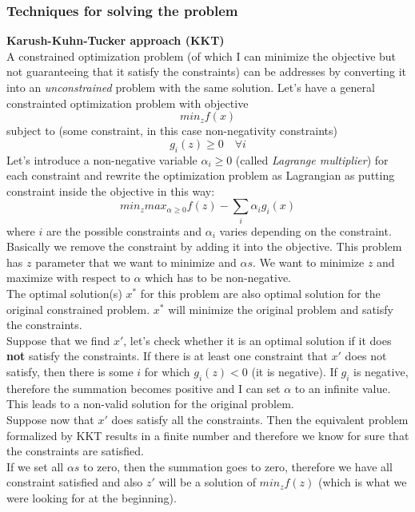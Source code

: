         \subsubsection{Techniques for solving the problem}
            \textbf{Karush-Kuhn-Tucker approach (KKT)}\\
            A constrained optimization problem (of which I can minimize the objective but not guaranteeing that it satisfy the constraints) can be addresses by converting it into an \textit{unconstrained} problem with the same solution. 
            Let's have a general constrainted optimization problem with objective
            $$min_z f(x)$$
            subject to (some constraint, in this case non-negativity constraints)
            $$g_i(z) \geq 0 \quad \forall i$$
            Let's introduce a non-negative variable $\alpha_i \geq 0$ (called \textit{Lagrange multiplier}) for each constraint and rewrite the optimization problem as Lagrangian as putting constraint inside the objective in this way:
            $$min_z max_{\alpha \geq 0} f(z) - \sum_{i} \alpha_i g_i(x)$$
            where $i$ are the possible constraints and $\alpha_i$ varies depending on the constraint. 
            Basically we remove the constraint by adding it into the objective. This problem has $z$ parameter that we want to minimize and $\alpha s$. We want to minimize $z$ and maximize with respect to $\alpha$ which has to be non-negative. \\
            The optimal solution(s) $x^*$ for this problem are also optimal solution for the original constrained problem. $x^*$ will minimize the original problem and satisfy the constraints.\\

            Suppose that we find $x'$, let's check whether it is an optimal solution if it does \textbf{not} satisfy the constraints. 
            If there is at least one constraint that $x'$ does not satisfy, then there is some $i$ for which  $g_i(z) < 0$ (it is negative). 
            If $g_i$ is negative, therefore the summation becomes positive and I can set $\alpha$ to an infinite value. 
            This leads to a non-valid solution for the original problem.\\

            Suppose now that $x'$ does satisfy all the constraints. Then the equivalent problem formalized by KKT results in a finite number and therefore we know for sure that the constraints are satisfied.\\
            If we set all $\alpha s$ to zero, then the summation goes to zero, therefore we have all constraint satisfied and also $z'$ will be a solution of $min_z f(z)$ (which is what we were looking for at the beginning).\\

